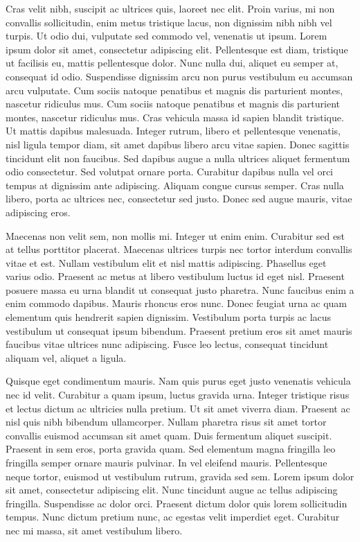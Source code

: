 \documentclass[botnum,fleqn,final]{unmeethesis}
\begin{document}
Cras velit nibh, suscipit ac ultrices quis, laoreet nec elit. Proin varius, mi
non convallis sollicitudin, enim metus tristique lacus, non dignissim nibh nibh
vel turpis. Ut odio dui, vulputate sed commodo vel, venenatis ut ipsum. Lorem
ipsum dolor sit amet, consectetur adipiscing elit. Pellentesque est diam,
tristique ut facilisis eu, mattis pellentesque dolor. Nunc nulla dui, aliquet
eu semper at, consequat id odio. Suspendisse dignissim arcu non purus
vestibulum eu accumsan arcu vulputate. Cum sociis natoque penatibus et magnis
dis parturient montes, nascetur ridiculus mus. Cum sociis natoque penatibus et
magnis dis parturient montes, nascetur ridiculus mus. Cras vehicula massa id
sapien blandit tristique. Ut mattis dapibus malesuada. Integer rutrum, libero
et pellentesque venenatis, nisl ligula tempor diam, sit amet dapibus libero
arcu vitae sapien. Donec sagittis tincidunt elit non faucibus. Sed dapibus
augue a nulla ultrices aliquet fermentum odio consectetur. Sed volutpat ornare
porta. Curabitur dapibus nulla vel orci tempus at dignissim ante adipiscing.
Aliquam congue cursus semper. Cras nulla libero, porta ac ultrices nec,
consectetur sed justo. Donec sed augue mauris, vitae adipiscing eros.

Maecenas non velit sem, non mollis mi. Integer ut enim enim. Curabitur sed est
at tellus porttitor placerat. Maecenas ultrices turpis nec tortor interdum
convallis vitae et est. Nullam vestibulum elit et nisl mattis adipiscing.
Phasellus eget varius odio. Praesent ac metus at libero vestibulum luctus id
eget nisl. Praesent posuere massa eu urna blandit ut consequat justo pharetra.
Nunc faucibus enim a enim commodo dapibus. Mauris rhoncus eros nunc. Donec
feugiat urna ac quam elementum quis hendrerit sapien dignissim. Vestibulum
porta turpis ac lacus vestibulum ut consequat ipsum bibendum. Praesent pretium
eros sit amet mauris faucibus vitae ultrices nunc adipiscing. Fusce leo lectus,
consequat tincidunt aliquam vel, aliquet a ligula.

Quisque eget condimentum mauris. Nam quis purus eget justo venenatis vehicula
nec id velit. Curabitur a quam ipsum, luctus gravida urna. Integer tristique
risus et lectus dictum ac ultricies nulla pretium. Ut sit amet viverra diam.
Praesent ac nisl quis nibh bibendum ullamcorper. Nullam pharetra risus sit amet
tortor convallis euismod accumsan sit amet quam. Duis fermentum aliquet
suscipit. Praesent in sem eros, porta gravida quam. Sed elementum magna
fringilla leo fringilla semper ornare mauris pulvinar. In vel eleifend mauris.
Pellentesque neque tortor, euismod ut vestibulum rutrum, gravida sed sem. Lorem
ipsum dolor sit amet, consectetur adipiscing elit. Nunc tincidunt augue ac
tellus adipiscing fringilla. Suspendisse ac dolor orci. Praesent dictum dolor
quis lorem sollicitudin tempus. Nunc dictum pretium nunc, ac egestas velit
imperdiet eget. Curabitur nec mi massa, sit amet vestibulum libero.
\end{document}
